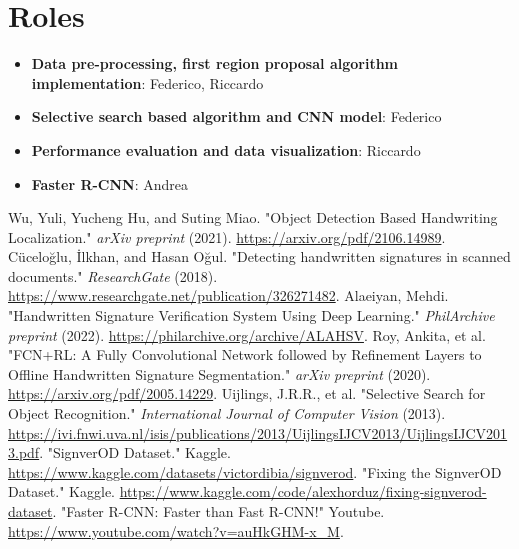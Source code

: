\documentclass[a4paper,12pt]{article}
\begin{document}
\section{Roles}
\begin{itemize}
    \item \textbf{Data pre-processing, first region proposal algorithm implementation}: Federico, Riccardo
    \item \textbf{Selective search based algorithm and CNN model}: Federico
    \item \textbf{Performance evaluation and data visualization}: Riccardo
    \item \textbf{Faster R-CNN}: Andrea
\end{itemize}

\begin{thebibliography}{9}
 Wu, Yuli, Yucheng Hu, and Suting Miao. "Object Detection Based Handwriting Localization." \textit{arXiv preprint} (2021). \url{https://arxiv.org/pdf/2106.14989}.
 Cüceloğlu, İlkhan, and Hasan Oğul. "Detecting handwritten signatures in scanned documents." \textit{ResearchGate} (2018). \url{https://www.researchgate.net/publication/326271482}.
 Alaeiyan, Mehdi. "Handwritten Signature Verification System Using Deep Learning." \textit{PhilArchive preprint} (2022). \url{https://philarchive.org/archive/ALAHSV}.
 Roy, Ankita, et al. "FCN+RL: A Fully Convolutional Network followed by Refinement Layers to Offline Handwritten Signature Segmentation." \textit{arXiv preprint} (2020). \url{https://arxiv.org/pdf/2005.14229}.
 Uijlings, J.R.R., et al. "Selective Search for Object Recognition." \textit{International Journal of Computer Vision} (2013). \url{https://ivi.fnwi.uva.nl/isis/publications/2013/UijlingsIJCV2013/UijlingsIJCV2013.pdf}.
 "SignverOD Dataset." Kaggle. \url{https://www.kaggle.com/datasets/victordibia/signverod}.
 "Fixing the SignverOD Dataset." Kaggle. \url{https://www.kaggle.com/code/alexhorduz/fixing-signverod-dataset}.
 "Faster R-CNN: Faster than Fast R-CNN!" Youtube.  \url{https://www.youtube.com/watch?v=auHkGHM-x_M}.
\end{thebibliography}
\end{document}

